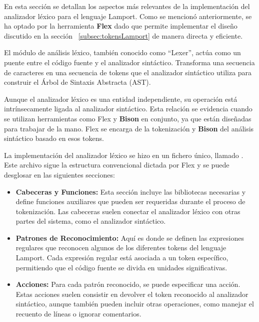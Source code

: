 En esta sección se detallan los aspectos más relevantes de la implementación del analizador léxico para el lenguaje Lamport. Como se mencionó anteriormente, se ha optado por la herramienta \textbf{Flex} dado que permite implementar el diseño discutido en la sección ~\ref{subsec:tokensLamport} de manera directa y eficiente.



El módulo de análisis léxico, también conocido como ``Lexer'', actúa como un puente entre el código fuente y el analizador sintáctico. Transforma una secuencia de caracteres en una secuencia de tokens que el analizador sintáctico utiliza para construir el Árbol de Sintaxis Abstracta (AST).



Aunque el analizador léxico es una entidad independiente, su operación está intrínsecamente ligada al analizador sintáctico. Esta relación se evidencia cuando se utilizan herramientas como Flex y \textbf{Bison} en conjunto, ya que están diseñadas para trabajar de la mano. Flex se encarga de la tokenización y \textbf{Bison} del análisis sintáctico basado en esos tokens.



La implementación del analizador léxico se hizo en un fichero único, llamado . Este archivo sigue la estructura convencional dictada por Flex y se puede desglosar en las siguientes secciones:

\begin{itemize}
    \item \textbf{Cabeceras y Funciones:} Esta sección incluye las bibliotecas necesarias y define funciones auxiliares que pueden ser requeridas durante el proceso de tokenización. Las cabeceras suelen conectar el analizador léxico con otras partes del sistema, como el analizador sintáctico.
    
    \item \textbf{Patrones de Reconocimiento:} Aquí es donde se definen las expresiones regulares que reconocen algunos de los diferentes tokens del lenguaje Lamport. Cada expresión regular está asociada a un token específico, permitiendo que el código fuente se divida en unidades significativas.
    \item \textbf{Acciones:} Para cada patrón reconocido, se puede especificar una acción. Estas acciones suelen consistir en devolver el token reconocido al analizador sintáctico, aunque también pueden incluir otras operaciones, como manejar el recuento de líneas o ignorar comentarios.
\end{itemize}


